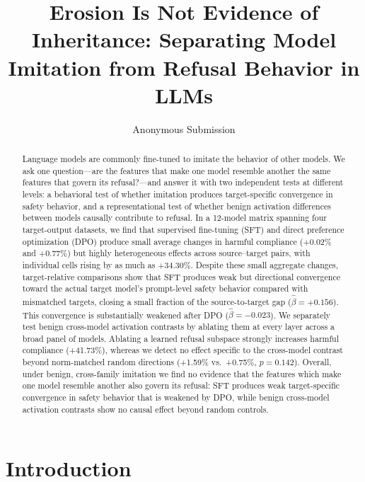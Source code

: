 \documentclass[letterpaper]{article}
\title{Erosion Is Not Evidence of Inheritance: Separating Model Imitation from Refusal Behavior in LLMs}
\author{Anonymous Submission}
\newcommand{\SFTMeanErosionPP}{+0.02}
\newcommand{\DPOMeanErosionPP}{+0.77}
\newcommand{\SFTMaxErosionPP}{+34.30}
\newcommand{\FpallFingerprintMeanEffectPP}{+1.59}
\newcommand{\FpallRandomMeanEffectPP}{+0.75}
\newcommand{\FpallConeMeanEffectPP}{+41.73}
\newcommand{\FpallFingerprintRandomP}{0.142}
\newcommand{\SFTTargetAlignmentSlope}{+0.156}
\newcommand{\DPOTargetAlignmentSlope}{-0.023}
\begin{document}
\maketitle

\begin{abstract}
Language models are commonly fine-tuned to imitate the behavior of other models. We ask one
question---are the features that make one model resemble another the same features that
govern its refusal?---and answer it with two independent tests at different levels: a
behavioral test of whether imitation produces target-specific convergence in safety
behavior, and a representational test of whether benign activation differences between
models causally contribute to refusal. In a 12-model matrix spanning
four target-output datasets, we find that supervised fine-tuning (SFT) and direct preference
optimization (DPO) produce small average changes in harmful compliance (\SFTMeanErosionPP\%
and \DPOMeanErosionPP\%) but highly heterogeneous effects across
source--target pairs, with individual cells rising by as much as \SFTMaxErosionPP\%.
Despite these small aggregate changes, target-relative comparisons show that SFT produces
weak but directional convergence toward the actual target model's prompt-level safety
behavior compared with mismatched targets, closing a small fraction of the source-to-target gap
($\hat\beta=\SFTTargetAlignmentSlope$). This
convergence is substantially weakened after DPO ($\hat\beta=\DPOTargetAlignmentSlope$). We
separately test benign cross-model activation contrasts by ablating them at every layer
across a broad panel of models. Ablating a learned refusal subspace strongly
increases harmful compliance (\FpallConeMeanEffectPP\%), whereas we detect no effect
specific to the cross-model contrast beyond norm-matched random directions
(\FpallFingerprintMeanEffectPP\% vs.\ \FpallRandomMeanEffectPP\%,
$p=\FpallFingerprintRandomP$). Overall, under benign, cross-family imitation we find no evidence that the features which
make one model resemble another also govern its refusal: SFT
produces weak target-specific convergence in safety behavior that is weakened by DPO,
while benign cross-model activation contrasts show no causal effect beyond random controls.
\end{abstract}

\section{Introduction}
\end{document}
